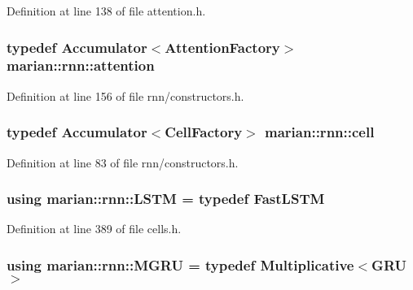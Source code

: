 Definition at line 138 of file attention.\+h.

\subsubsection[{\texorpdfstring{attention}{attention}}]{\setlength{\rightskip}{0pt plus 5cm}typedef {\bf Accumulator}$<${\bf Attention\+Factory}$>$ {\bf marian\+::rnn\+::attention}}\hypertarget{namespacemarian_1_1rnn_a57316dc4c756edb2a8dfabea7e50d92b}{}\label{namespacemarian_1_1rnn_a57316dc4c756edb2a8dfabea7e50d92b}


Definition at line 156 of file rnn/constructors.\+h.

\subsubsection[{\texorpdfstring{cell}{cell}}]{\setlength{\rightskip}{0pt plus 5cm}typedef {\bf Accumulator}$<${\bf Cell\+Factory}$>$ {\bf marian\+::rnn\+::cell}}\hypertarget{namespacemarian_1_1rnn_af723e51535e0b11de5b28fe19627a3fb}{}\label{namespacemarian_1_1rnn_af723e51535e0b11de5b28fe19627a3fb}


Definition at line 83 of file rnn/constructors.\+h.

\subsubsection[{\texorpdfstring{L\+S\+TM}{LSTM}}]{\setlength{\rightskip}{0pt plus 5cm}using {\bf marian\+::rnn\+::\+L\+S\+TM} = typedef {\bf Fast\+L\+S\+TM}}\hypertarget{namespacemarian_1_1rnn_a386737951397fd1835581e82809f052a}{}\label{namespacemarian_1_1rnn_a386737951397fd1835581e82809f052a}


Definition at line 389 of file cells.\+h.

\subsubsection[{\texorpdfstring{M\+G\+RU}{MGRU}}]{\setlength{\rightskip}{0pt plus 5cm}using {\bf marian\+::rnn\+::\+M\+G\+RU} = typedef {\bf Multiplicative}$<${\bf G\+RU}$>$}\hypertarget{namespacemarian_1_1rnn_aa3f59f19b6e405cf6f4671cc027fcf7a}{}\label{namespacemarian_1_1rnn_aa3f59f19b6e405cf6f4671cc027fcf7a}


